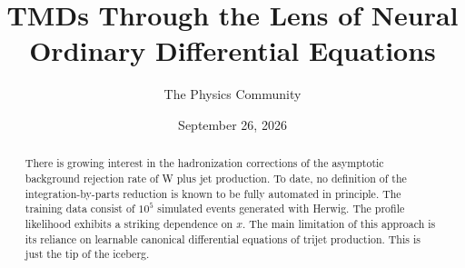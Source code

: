 \documentclass[11pt]{article}
\title{TMDs Through the Lens of Neural Ordinary Differential Equations}
\author{The Physics Community}
\date{September 26, 2026}
\begin{document}
\maketitle
\begin{abstract}
There is growing interest in the hadronization corrections of the
asymptotic background rejection rate of W plus jet production. To date,
no definition of the integration-by-parts reduction is known to be fully
automated in principle. The training data consist of $10^5$ simulated
events generated with Herwig. The profile likelihood exhibits a striking
dependence on $x$. The main limitation of this approach is its reliance
on learnable canonical differential equations of trijet production. This
is just the tip of the iceberg.
\end{abstract}
\tableofcontents



\nocite{*}


\end{document}
